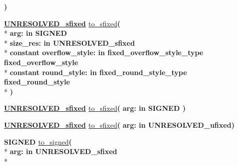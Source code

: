 \begin{DoxyCompactItemize}
{\bfseries  )} 
\item 
{\bfseries {\bfseries {\bfseries \hyperlink{classfixed__pkg_aa723b28a027c3c0f9bca02d75e8df4d6}{U\+N\+R\+E\+S\+O\+L\+V\+E\+D\+\_\+sfixed}} \textcolor{vhdlchar}{ }}} \hyperlink{classfixed__pkg_a575822ec305f0e37fa911df9b379bf4c}{to\+\_\+sfixed}{\bfseries  ( }\\*
{\bfseries \textcolor{vhdlchar}{arg\+: }\textcolor{stringliteral}{in }{\bfseries \textcolor{comment}{S\+I\+G\+N\+E\+D}\textcolor{vhdlchar}{ }}}\\*
{\bfseries \textcolor{vhdlchar}{size\+\_\+res\+: }\textcolor{stringliteral}{in }\textcolor{vhdlchar}{U\+N\+R\+E\+S\+O\+L\+V\+E\+D\+\_\+sfixed}}\\*
{\bfseries {\bfseries \textcolor{keywordflow}{constant}\textcolor{vhdlchar}{ }}\textcolor{vhdlchar}{overflow\+\_\+style\+: }\textcolor{stringliteral}{in }\textcolor{vhdlchar}{fixed\+\_\+overflow\+\_\+style\+\_\+type     fixed\+\_\+overflow\+\_\+style}}\\*
{\bfseries {\bfseries \textcolor{keywordflow}{constant}\textcolor{vhdlchar}{ }}\textcolor{vhdlchar}{round\+\_\+style\+: }\textcolor{stringliteral}{in }\textcolor{vhdlchar}{fixed\+\_\+round\+\_\+style\+\_\+type     fixed\+\_\+round\+\_\+style}}\\*
{\bfseries  )} 
\item 
{\bfseries {\bfseries {\bfseries \hyperlink{classfixed__pkg_aa723b28a027c3c0f9bca02d75e8df4d6}{U\+N\+R\+E\+S\+O\+L\+V\+E\+D\+\_\+sfixed}} \textcolor{vhdlchar}{ }}} \hyperlink{classfixed__pkg_a1f688b4a8b367776e7de9dfafd6d0b9b}{to\+\_\+sfixed}{\bfseries  ( }{\bfseries \textcolor{vhdlchar}{arg\+: }\textcolor{stringliteral}{in }{\bfseries \textcolor{comment}{S\+I\+G\+N\+E\+D}\textcolor{vhdlchar}{ }}}{\bfseries  )} 
\item 
{\bfseries {\bfseries {\bfseries \hyperlink{classfixed__pkg_aa723b28a027c3c0f9bca02d75e8df4d6}{U\+N\+R\+E\+S\+O\+L\+V\+E\+D\+\_\+sfixed}} \textcolor{vhdlchar}{ }}} \hyperlink{classfixed__pkg_a1f688b4a8b367776e7de9dfafd6d0b9b}{to\+\_\+sfixed}{\bfseries  ( }{\bfseries \textcolor{vhdlchar}{arg\+: }\textcolor{stringliteral}{in }\textcolor{vhdlchar}{U\+N\+R\+E\+S\+O\+L\+V\+E\+D\+\_\+ufixed}}{\bfseries  )} 
\item 
{\bfseries {\bfseries \textcolor{comment}{S\+I\+G\+N\+E\+D}\textcolor{vhdlchar}{ }}} \hyperlink{classfixed__pkg_a470ec6100534d89d907b3d8e672b3e6b}{to\+\_\+signed}{\bfseries  ( }\\*
{\bfseries \textcolor{vhdlchar}{arg\+: }\textcolor{stringliteral}{in }\textcolor{vhdlchar}{U\+N\+R\+E\+S\+O\+L\+V\+E\+D\+\_\+sfixed}}\\*

\end{DoxyCompactItemize}
